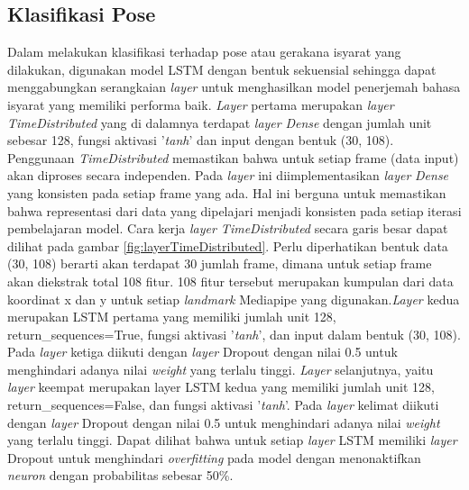 \subsection{Klasifikasi Pose}
\label{sec:metodologipose}

Dalam melakukan klasifikasi terhadap pose atau gerakana isyarat yang dilakukan, digunakan model LSTM dengan bentuk sekuensial sehingga dapat menggabungkan serangkaian \emph{layer} untuk menghasilkan model penerjemah bahasa isyarat yang memiliki performa baik. \emph{Layer} pertama merupakan \emph{layer} \textit{TimeDistributed} yang di dalamnya terdapat \emph{layer} \textit{Dense} dengan jumlah unit sebesar 128, fungsi aktivasi '\textit{tanh}' dan input dengan bentuk (30, 108). Penggunaan \textit{TimeDistributed} memastikan bahwa untuk setiap frame (data input) akan diproses secara independen. Pada \emph{layer} ini diimplementasikan \emph{layer} \textit{Dense} yang konsisten pada setiap frame yang ada. Hal ini berguna untuk memastikan bahwa representasi dari data yang dipelajari menjadi konsisten pada setiap iterasi pembelajaran model. Cara kerja \emph{layer TimeDistributed} secara garis besar dapat dilihat pada gambar \ref{fig:layerTimeDistributed}. Perlu diperhatikan bentuk data (30, 108) berarti akan terdapat 30 jumlah frame, dimana untuk setiap frame akan diekstrak total 108 fitur. 108 fitur tersebut merupakan kumpulan dari data koordinat x dan y untuk setiap \emph{landmark} Mediapipe yang digunakan.\emph{Layer} kedua merupakan LSTM pertama yang memiliki jumlah unit 128, return\_sequences=True, fungsi aktivasi '\textit{tanh}', dan input dalam bentuk (30, 108). Pada \emph{layer} ketiga diikuti dengan \emph{layer} Dropout dengan nilai 0.5 untuk menghindari adanya nilai \emph{weight} yang terlalu tinggi. \emph{Layer} selanjutnya, yaitu \emph{layer} keempat merupakan layer LSTM kedua yang memiliki jumlah unit 128, return\_sequences=False, dan fungsi aktivasi '\textit{tanh}'. Pada \emph{layer} kelimat diikuti dengan \emph{layer} Dropout dengan nilai 0.5 untuk menghindari adanya nilai \emph{weight} yang terlalu tinggi. Dapat dilihat bahwa untuk setiap \emph{layer} LSTM memiliki \emph{layer} Dropout untuk menghindari \emph{overfitting} pada model dengan menonaktifkan \emph{neuron} dengan probabilitas sebesar 50\%. 

